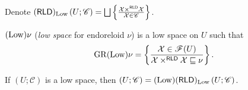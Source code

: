 
\begin{defn}
  Denote $(\mathsf{RLD})_{\Low} \left( U ; \mathscr{C} \right) =
  \bigsqcup \setcond{ \mathcal{X} \times^{\mathsf{RLD}} \mathcal{X}}
  {\mathcal{X} \in \mathscr{C} }$.
\end{defn}

\begin{defn}
  $(\operatorname{Low}) \nu$ (\emph{low space} for endoreloid $\nu$) is a low
  space on $U$ such that
  \[ \operatorname{GR} (\operatorname{Low}) \nu = \left\{ \frac{\mathcal{X} \in \mathscr{F}(U)}{\mathcal{X} \times^{\mathsf{RLD}} \mathcal{X} \sqsubseteq \nu }\right\} . \]
\end{defn}

\begin{thm}
  If $\left( U ; \mathscr{C} \right)$ is a low space, then $\left( U ;
  \mathscr{C} \right) = (\operatorname{Low}) (\mathsf{RLD})_{\operatorname{Low}} \left(
  U ; \mathscr{C} \right)$.
\end{thm}

